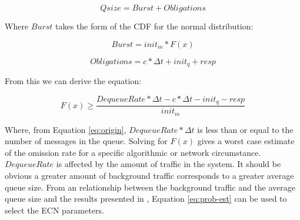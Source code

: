 \begin{equation}
Qsize = Burst + Obligations
\end{equation}

Where $Burst$ takes the form of the \ac{CDF} for the normal distribution:

\begin{equation}
Burst = init_m * F(x)  
\end{equation}

\begin{equation}
Obligations = c * \Delta t + init_q + resp
\end{equation}

From this we can derive the equation:

\begin{equation}
F(x) \geq \frac{DequeueRate * \Delta t - c * \Delta t - init_q - resp}{init_m}
\label{eq:prob-est}
\end{equation}

Where, from Equation \ref{eq:origin}, $DequeueRate * \Delta t$ is less than or equal to the number of messages in the queue. 
Solving for $F(x)$ gives a worst case estimate of the omission rate for a specific algorithmic or network circumstance.
$DequeueRate$ is affected by the amount of traffic in the system. 
It should be obvious a greater amount of background traffic corresponds to a greater average queue size.
From an relationship between the background traffic and the average queue size and the results presented in \cite{JOURNAL}, Equation \ref{eq:prob-est} can be used to select the ECN parameters.
